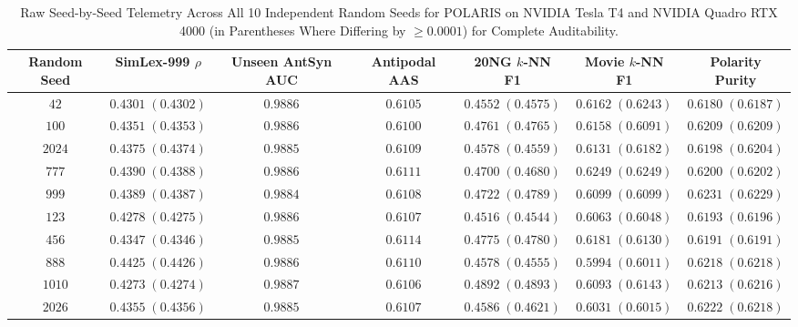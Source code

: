 \documentclass[journal]{IEEEtran}
\begin{document}
\begin{table}[!t]
\centering
\caption{Raw Seed-by-Seed Telemetry Across All 10 Independent Random Seeds for POLARIS on NVIDIA Tesla T4 and NVIDIA Quadro RTX 4000 (in Parentheses Where Differing by $\ge 0.0001$) for Complete Auditability.}
\label{tab:seed_telemetry}
\begin{tabular}{ccccccc}
\toprule
\textbf{Random Seed} & \textbf{SimLex-999 $\rho$} & \textbf{Unseen AntSyn AUC} & \textbf{Antipodal AAS} & \textbf{20NG $k$-NN F1} & \textbf{Movie $k$-NN F1} & \textbf{Polarity Purity} \\
\midrule
$42$   & $0.4301 \; (0.4302)$ & $0.9886$ & $0.6105$ & $0.4552 \; (0.4575)$ & $0.6162 \; (0.6243)$ & $0.6180 \; (0.6187)$ \\
$100$  & $0.4351 \; (0.4353)$ & $0.9886$ & $0.6100$ & $0.4761 \; (0.4765)$ & $0.6158 \; (0.6091)$ & $0.6209 \; (0.6209)$ \\
$2024$ & $0.4375 \; (0.4374)$ & $0.9885$ & $0.6109$ & $0.4578 \; (0.4559)$ & $0.6131 \; (0.6182)$ & $0.6198 \; (0.6204)$ \\
$777$  & $0.4390 \; (0.4388)$ & $0.9886$ & $0.6111$ & $0.4700 \; (0.4680)$ & $0.6249 \; (0.6249)$ & $0.6200 \; (0.6202)$ \\
$999$  & $0.4389 \; (0.4387)$ & $0.9884$ & $0.6108$ & $0.4722 \; (0.4789)$ & $0.6099 \; (0.6099)$ & $0.6231 \; (0.6229)$ \\
$123$  & $0.4278 \; (0.4275)$ & $0.9886$ & $0.6107$ & $0.4516 \; (0.4544)$ & $0.6063 \; (0.6048)$ & $0.6193 \; (0.6196)$ \\
$456$  & $0.4347 \; (0.4346)$ & $0.9885$ & $0.6114$ & $0.4775 \; (0.4780)$ & $0.6181 \; (0.6130)$ & $0.6191 \; (0.6191)$ \\
$888$  & $0.4425 \; (0.4426)$ & $0.9886$ & $0.6110$ & $0.4578 \; (0.4555)$ & $0.5994 \; (0.6011)$ & $0.6218 \; (0.6218)$ \\
$1010$ & $0.4273 \; (0.4274)$ & $0.9887$ & $0.6106$ & $0.4892 \; (0.4893)$ & $0.6093 \; (0.6143)$ & $0.6213 \; (0.6216)$ \\
$2026$ & $0.4355 \; (0.4356)$ & $0.9885$ & $0.6107$ & $0.4586 \; (0.4621)$ & $0.6031 \; (0.6015)$ & $0.6222 \; (0.6218)$ \\
\bottomrule
\end{tabular}
\end{table}
\end{document}

